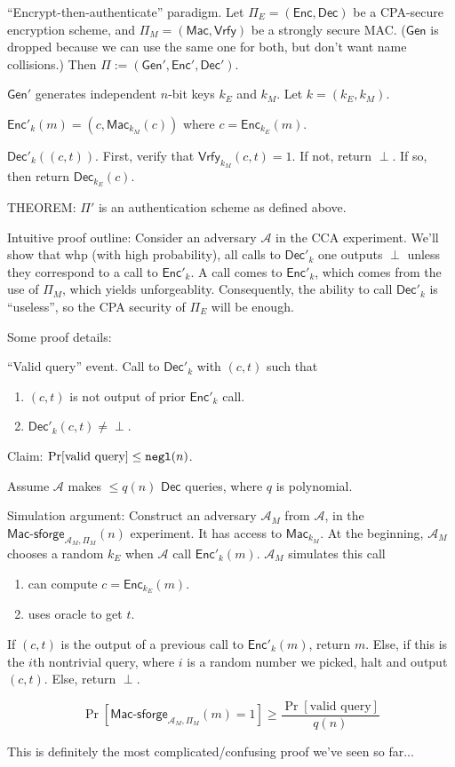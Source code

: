\documentclass[12pt]{article}
\newcommand{\AAA}{\mathcal{A}}
\newcommand{\Enc}{\mathsf{Enc}}
\newcommand{\Dec}{\mathsf{Dec}}
\newcommand{\Mac}{\mathsf{Mac}}
\newcommand{\Macsf}{\mathsf{Mac\text{-}sforge}}
\newcommand{\Vrfy}{\mathsf{Vrfy}}
\newcommand{\Gen}{\mathsf{Gen}}
\newcommand{\negl}{{\tt negl}}
\begin{document}
``Encrypt-then-authenticate'' paradigm. Let $\Pi_E=(\Enc,\Dec)$ be a CPA-secure encryption scheme, and $\Pi_M=(\Mac,\Vrfy)$ be a strongly secure MAC. ($\Gen$ is dropped because we can use the same one for both, but don't want name collisions.) Then $\Pi:=(\Gen',\Enc',\Dec')$.

$\Gen'$ generates independent $n$-bit keys $k_E$ and $k_M$. Let $k=(k_E,k_M)$.

$\Enc'_k(m)=(c,\Mac_{k_M}(c))$ where $c=\Enc_{k_E}(m)$.

$\Dec'_k((c,t))$. First, verify that $\Vrfy_{k_M}(c,t)=1$. If not, return $\perp$. If so, then return $\Dec_{k_E}(c)$.

THEOREM: $\Pi'$ is an authentication scheme as defined above.

Intuitive proof outline: Consider an adversary $\AAA$ in the CCA experiment. We'll show that whp (with high probability), all calls to $\Dec'_k$ one outputs $\perp$ unless they correspond to a call to $\Enc'_k$. A call comes to $\Enc'_k$, which comes from the use of $\Pi_M$, which yields unforgeablity. Consequently, the ability to call $\Dec'_k$ is ``useless'', so the CPA security of $\Pi_E$ will be enough.

Some proof details:

``Valid query'' event. Call to $\Dec'_k$ with $(c,t)$ such that\begin{enumerate}

\item $(c,t)$ is not output of prior $\Enc'_k$ call.

\item $\Dec'_k(c,t)\neq\perp$.

\end{enumerate}

Claim: $\Pr[\text{valid query}]\leq\negl(n)$.

Assume $\AAA$ makes $\leq q(n)$ $\Dec$ queries, where $q$ is polynomial.

Simulation argument: Construct an adversary $\AAA_M$ from $\AAA$, in the $\Macsf_{\AAA_M,\Pi_M}(n)$ experiment. It has access to $\Mac_{k_M}$. At the beginning, $\AAA_M$ chooses a random $k_E$ when $\AAA$ call $\Enc'_k(m)$. $\AAA_M$ simulates this call\begin{enumerate}

\item can compute $c=\Enc_{k_E}(m)$.

\item uses oracle to get $t$.

\end{enumerate}

If $(c,t)$ is the output of a previous call to $\Enc'_k(m)$, return $m$. Else, if this is the $i$th nontrivial query, where $i$ is a random number we picked, halt and output $(c,t)$. Else, return $\perp$.

$$\Pr\left[\Macsf_{\AAA_M,\Pi_M}(m)=1\right]\geq\frac{\Pr[\text{valid query}]}{q(n)}$$

This is definitely the most complicated/confusing proof we've seen so far...
\end{document}
